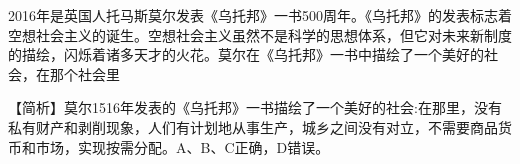 \question 2016年是英国人托马斯莫尔发表《乌托邦》一书500周年。《乌托邦》的发表标志着空想社会主义的诞生。空想社会主义虽然不是科学的思想体系，但它对未来新制度的描绘，闪烁着诸多天才的火花。莫尔在《乌托邦》一书中描绘了一个美好的社会，在那个社会里
\par{}
\begin{solution}【简析】莫尔1516年发表的《乌托邦》一书描绘了一个美好的社会:在那里，没有私有财产和剥削现象，人们有计划地从事生产，城乡之间没有对立，不需要商品货币和市场，实现按需分配。A、B、C正确，D错误。
\end{solution}
